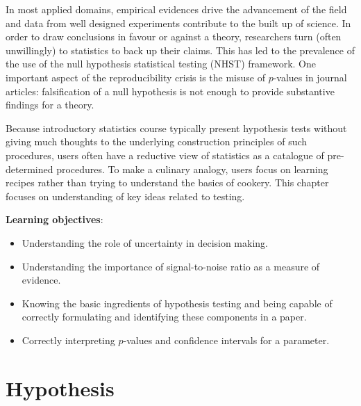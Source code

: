 \documentclass[
  11pt,
  letterpaper,
]{scrbook}
\providecommand{\tightlist}{%
  \setlength{\itemsep}{0pt}\setlength{\parskip}{0pt}}\usepackage{longtable,booktabs,array}
\theoremstyle{definition}
\theoremstyle{remark}
\begin{document}
In most applied domains, empirical evidences drive the advancement of
the field and data from well designed experiments contribute to the
built up of science. In order to draw conclusions in favour or against a
theory, researchers turn (often unwillingly) to statistics to back up
their claims. This has led to the prevalence of the use of the null
hypothesis statistical testing (NHST) framework. One important aspect of
the reproducibility crisis is the misuse of \(p\)-values in journal
articles: falsification of a null hypothesis is not enough to provide
substantive findings for a theory.

Because introductory statistics course typically present hypothesis
tests without giving much thoughts to the underlying construction
principles of such procedures, users often have a reductive view of
statistics as a catalogue of pre-determined procedures. To make a
culinary analogy, users focus on learning recipes rather than trying to
understand the basics of cookery. This chapter focuses on understanding
of key ideas related to testing.

\begin{tcolorbox}[enhanced jigsaw, breakable, toptitle=1mm, left=2mm, bottomrule=.15mm, colframe=quarto-callout-important-color-frame, colback=white, rightrule=.15mm, title=\textcolor{quarto-callout-important-color}{\faExclamation}\hspace{0.5em}{Key concept}, opacityback=0, toprule=.15mm, titlerule=0mm, colbacktitle=quarto-callout-important-color!10!white, bottomtitle=1mm, arc=.35mm, coltitle=black, opacitybacktitle=0.6, leftrule=.75mm]

\textbf{Learning objectives}:

\begin{itemize}
\tightlist
\item
  Understanding the role of uncertainty in decision making.
\item
  Understanding the importance of signal-to-noise ratio as a measure of
  evidence.
\item
  Knowing the basic ingredients of hypothesis testing and being capable
  of correctly formulating and identifying these components in a paper.
\item
  Correctly interpreting \(p\)-values and confidence intervals for a
  parameter.
\end{itemize}

\end{tcolorbox}

\hypertarget{hypothesis}{%
\section{Hypothesis}\label{hypothesis}}
\end{document}
